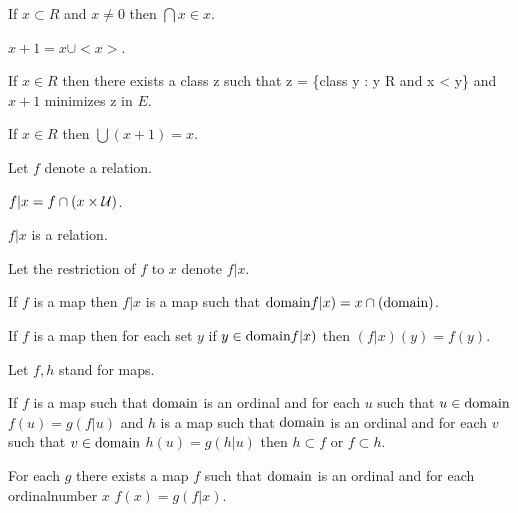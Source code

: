 \documentclass[a4paper,draft]{amsproc}
\begin{document}
\begin{forthel}
\begin{theorem}[121]
If $x \subset R$ and $x \neq 0$ then $\bigcap x \in x$.
\end{theorem}

\begin{definition}[122]
$x + 1 = x \cup <x>$.
\end{definition}

\begin{theorem}[123]
If $x \in R$ then there exists a class z such that z = \{class y : y \in R and x < y\} and
$x + 1$ minimizes z in $E$.
\end{theorem}

\begin{theorem}[124]
If $x \in R$ then $\bigcup (x + 1) = x$.
\end{theorem}

Let $f$ denote a relation.
\begin{definition}
$f | x = f \cap (x \times \cal{U})$.
\end{definition}

\begin{lemma}
$f | x$ is a relation.
\end{lemma}

Let the restriction of $f$ to $x$ denote $f | x$.

\begin{theorem}[126a]
If $f$ is a map then $f | x$ is a map such that $\domain (f | x) = x \cap (\domain f)$.
\end{theorem}

\begin{theorem}[126b]
If $f$ is a map then for each set $y$ if $y \in \domain (f | x)$ then $(f | x)(y) = f(y)$.
\end{theorem}

Let $f, h$ stand for maps.
\begin{theorem}[127]
If $f$ is a map such that $\domain f$ is an ordinal and for each $u$ such that $u \in \domain f$ $f(u) = g(f | u)$
and $h$ is a map such that $\domain h$ is an ordinal and for each $v$ such that $v \in \domain h$ $h(u) = g(h | u)$
then $h \subset f$ or $f \subset h$.
\end{theorem}

\begin{theorem}[128]
For each $g$ there exists a %
map $f$ such that $\domain f$ is an ordinal
and for each ordinalnumber $x$ $f(x) = g(f | x)$.
\end{theorem}

\end{forthel}
\end{document}
